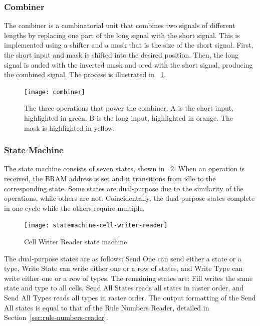 \subsubsection{Combiner}

The combiner is a combinatorial unit that combines two signals of different lengths by replacing one part of the long signal with the short signal.
This is implemented using a shifter and a mask that is the size of the short signal.
First, the short input and mask is shifted into the desired position.
Then, the long signal is anded with the inverted mask and ored with the short signal, producing the combined signal.
The process is illustrated in \figurename~\ref{fig:combiner}.

\begin{figure}[!ht]
    \centering
    \texttt{[image: combiner]}
    \caption[Combiner operation]{
        The three operations that power the combiner.
        A is the short input, highlighted in green.
        B is the long input, highlighted in orange.
        The mask is highlighted in yellow.
    }
    \label{fig:combiner}
\end{figure}

\subsubsection{State Machine}

The state machine consists of seven states, shown in \figurename~\ref{fig:statemachine-cell-writer-reader}.
When an operation is received, the BRAM address is set and it transitions from idle to the corresponding state.
Some states are dual-purpose due to the similarity of the operations, while others are not.
Coincidentally, the dual-purpose states complete in one cycle while the others require multiple\footnotemark.

\begin{figure}[!ht]
    \centering
    \texttt{[image: statemachine-cell-writer-reader]}
    \caption{Cell Writer Reader state machine}
    \label{fig:statemachine-cell-writer-reader}
\end{figure}

The dual-purpose states are as follows:
Send One can send either a state or a type, Write State can write either one or a row of states, and Write Type can write either one or a row of types.
The remaining states are:
Fill writes the same state and type to all cells, Send All States reads all states in raster order, and Send All Types reads all types in raster order.
The output formatting of the Send All states is equal to that of the Rule Numbers Reader, detailed in Section~\ref{sec:rule-numbers-reader}.

